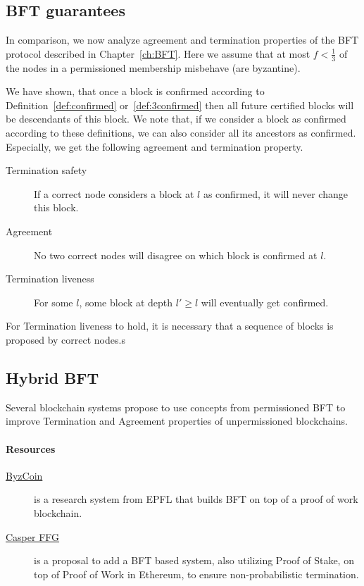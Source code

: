\subsection{BFT guarantees}
In comparison, we now analyze agreement and termination properties of the BFT protocol described in Chapter~\ref{ch:BFT}. 
Here we assume that at most $f<\frac{1}{3}$ of the nodes in a permissioned membership misbehave (are byzantine).

We have shown, that once a block is confirmed according to Definition~\ref{def:confirmed} or~\ref{def:3confirmed} then all future certified blocks will be descendants of this block. We note that, if we consider a block as confirmed according to these definitions, we can also consider all its ancestors as confirmed. Especially, we get the following agreement and termination property.

\begin{description}
	\item[Termination safety] If a correct node considers a block at \depth $l$ as confirmed, it will never change this block.
	\item[Agreement] No two correct nodes will disagree on which block is confirmed at \depth $l$.
	\item[Termination liveness] For some \depth $l$, some block at depth $l'\geq l$ will eventually get confirmed.
\end{description}

For Termination liveness to hold, it is necessary that a sequence of blocks is proposed by correct nodes.s

\subsection{Hybrid BFT}
Several blockchain systems propose to use concepts from permissioned BFT to improve Termination and Agreement properties of unpermissioned blockchains. 

\paragraph{Resources}
\begin{description}
	\item[ \href{https://www.usenix.org/conference/usenixsecurity16/technical-sessions/presentation/kogias}{ByzCoin}] is a research system from EPFL that builds BFT on top of a proof of work blockchain.
	\item[\href{https://arxiv.org/pdf/1710.09437.pdf}{Casper FFG}] is a proposal to add a BFT based system, also utilizing Proof of Stake, on top of Proof of Work in Ethereum, to ensure non-probabilistic termination. 
\end{description}

